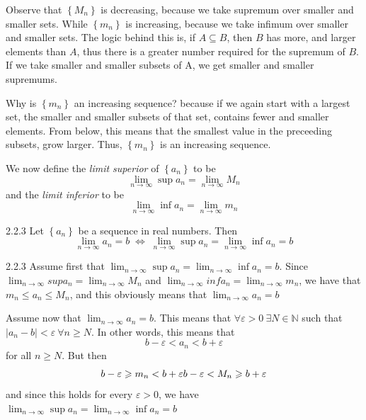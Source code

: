 \documentclass[a4paper,norsk]{article}
\renewcommand{\geq}{\geqslant}
\renewcommand{\leq}{\leqslant}
\renewcommand{\epsilon}{\varepsilon}
\begin{document}
Observe that $ \left\{ M_n \right\}  $ is decreasing, because we take supremum over smaller and smaller sets. While $ \left\{ m_n \right\}  $ is increasing, because we take infimum over smaller and smaller sets. The logic behind this is, if $ A \subseteq B $, then $ B $ has more, and larger elements than $ A $, thus there is a greater number required for the supremum of $ B $. If we take smaller and smaller subsets of A, we get smaller and smaller supremums.

Why is $ \left\{ m_n \right\}  $ an increasing sequence? because if we again start with a largest set, the smaller and smaller subsets of that set, contains fewer and smaller elements. From below, this means that the smallest value in the preceeding subsets, grow larger. Thus, $ \left\{ m_n \right\}  $ is an increasing sequence.



We now define the \textit{limit superior} of $ \left\{ a_n \right\}  $ to be
\[
    \lim_{n \to \infty} \sup a_n = \lim_{n \to \infty} M_n 
\]
and the \textit{limit inferior} to be
\[
    \lim_{n \to \infty} \inf a_n = \lim_{n \to \infty} m_n
\]


\begin{propositionbox}{2.2.3}{}
Let $ \left\{ a_n \right\}  $ be a sequence in real numbers. Then
\[
    \lim_{n \to \infty} a_n = b \;  \iff \; \lim_{n \to \infty} \sup a_n = \lim_{n \to \infty} \inf a_n = b
\]

\begin{proofbox}{2.2.3}{}
  Assume first that $ \lim_{ n \to \infty} \sup a_n = \lim_{n \to \infty} \inf a_n = b   $. Since $ \lim_{n \to \infty} sup a_n = \lim_{n \to \infty} M_n  $ and $ \lim_{n \to \infty} inf a_n = \lim_{n \to \infty} m_n $, we have that $ m_n \leq a_n \leq M_n $, and this obviously means that $ \lim_{n \to \infty} a_n = b  $ 


  Assume now that $ \lim_{n \to \infty} a_n = b $. This means that $ \forall \epsilon > 0 \: \exists N \in  \mathbb{N} $ such that $ \left| a_n - b \right| < \epsilon \: \forall n \geq N $. In other words, this means that
  \[
      b - \epsilon  < a_n < b + \epsilon 
  \]
  for all $ n \geq N $. But then
  \[
      b - \epsilon \geq m_n < b + \epsilon \\
      b - \epsilon  < M_n \geq b + \epsilon 
  \]
  and since this holds for every $ \epsilon > 0 $, we have $ \lim_{n \to \infty} \sup a_n = \lim_{n \to \infty} \inf a_n = b  $   
\end{proofbox}
\end{propositionbox}
\end{document}
